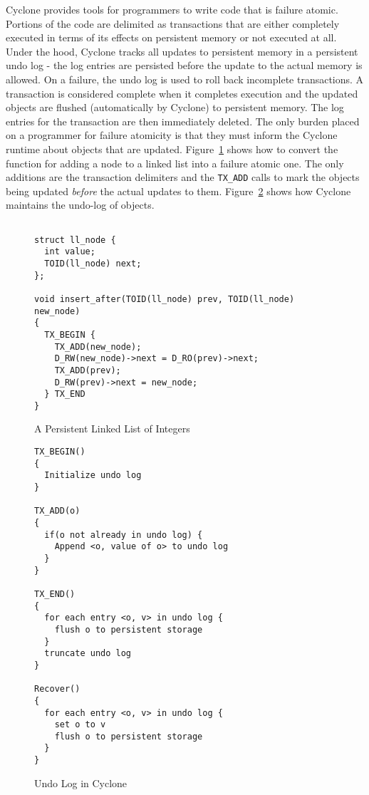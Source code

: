 \documentclass[twocolumn]{article}
\begin{document}
Cyclone provides tools for programmers to write code that is failure
atomic. Portions of the code are delimited as transactions that are either
completely executed in terms of its effects on persistent memory or not executed
at all. Under the hood, Cyclone tracks all updates to persistent memory in a
persistent undo log - the log entries are persisted before the update to the
actual memory is allowed. On a failure, the undo log is used to roll back
incomplete transactions. A transaction is considered complete when it completes
execution and the updated objects are flushed (automatically by Cyclone) to
persistent memory. The log entries for the transaction are then immediately
deleted. The only burden placed on a programmer for failure atomicity is that
they must inform the Cyclone runtime about objects that are
updated. Figure~\ref{fig:example_fatomic} shows how to convert the function for
adding a node to a linked list into a failure atomic one. The only additions are
the transaction delimiters and the {\tt TX\_ADD} calls to mark the objects being
updated \emph{before} the actual updates to them. Figure~\ref{fig:undo_log}
shows how Cyclone maintains the undo-log of objects.


\begin{figure}
{ \scriptsize
\begin{verbatim}

struct ll_node {
  int value;
  TOID(ll_node) next;
};

void insert_after(TOID(ll_node) prev, TOID(ll_node) new_node)
{
  TX_BEGIN {
    TX_ADD(new_node);
    D_RW(new_node)->next = D_RO(prev)->next;
    TX_ADD(prev);
    D_RW(prev)->next = new_node;
  } TX_END
}

\end{verbatim}
}
\caption{A Persistent Linked List of Integers}
\label{fig:example_fatomic}
\end{figure}

\begin{figure}
{ \scriptsize
\begin{verbatim}
TX_BEGIN()
{
  Initialize undo log
}

TX_ADD(o)
{
  if(o not already in undo log) {
    Append <o, value of o> to undo log
  }
}

TX_END()
{
  for each entry <o, v> in undo log {
    flush o to persistent storage
  }
  truncate undo log
}

Recover()
{
  for each entry <o, v> in undo log {
    set o to v
    flush o to persistent storage
  }   
}

\end{verbatim}
}
\caption{Undo Log in Cyclone}
\label{fig:undo_log}
\end{figure}
\end{document}
